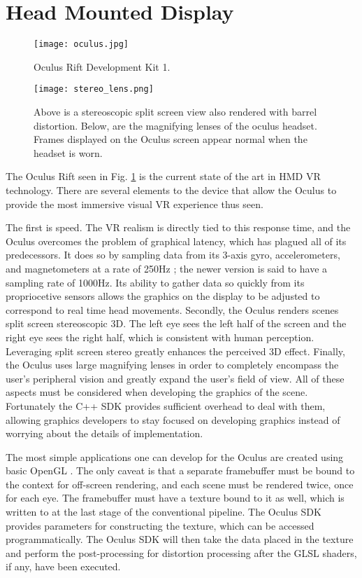 \section{Head Mounted Display}
\label{sec:hmd}

\begin{figure}[]
\centering
\texttt{[image: oculus.jpg]}
\caption{Oculus Rift Development Kit 1. 
\cite{website:pcworld}}
\label{fig:oculus}
\end{figure}

\begin{figure}[]
\centering
\texttt{[image: stereo\_lens.png]}
\caption{Above is a stereoscopic split screen view also rendered with barrel distortion.
    Below, are the magnifying lenses of the oculus headset.
Frames displayed on the Oculus screen appear normal when the headset is worn.}
\label{fig:stereo}
\end{figure}


The Oculus Rift seen in Fig. \ref{fig:oculus} is the current state of the art
in HMD VR technology. There are several elements to the device that allow the
Oculus to provide the most immersive visual VR experience thus seen.

The first is speed.  The VR realism is directly tied to this response time, and
the Oculus overcomes the problem of graphical latency, which has plagued all of
its predecessors. It does so by sampling data from its 3-axis gyro,
accelerometers, and magnetometers at a rate of 250Hz \cite{website:roadtovr};
the newer version is said to have a sampling rate of 1000Hz. Its ability to
gather data so quickly from its propriocetive sensors allows the graphics on
the display to be adjusted to correspond to real time head movements. Secondly,
the Oculus renders scenes split screen stereoscopic 3D. The left eye sees the
left half of the screen and the right eye sees the right half, which is
consistent with human perception. Leveraging split screen stereo greatly
enhances the perceived 3D effect. Finally, the Oculus uses large magnifying
lenses in order to completely encompass the user's peripheral vision and
greatly expand the user's field of view. All of these aspects must be
considered when developing the graphics of the scene. Fortunately the C++ SDK
provides sufficient overhead to deal with them, allowing graphics developers to
stay focused on developing graphics instead of worrying about the details of
implementation.

The most simple applications one can develop for the Oculus are created using
basic OpenGL \cite{website:opengl}. The only caveat is that a separate
framebuffer must be bound to the context for off-screen rendering, and each
scene must be rendered twice, once for each eye. The framebuffer must have a
texture bound to it as well, which is written to at the last stage of the
conventional pipeline.  The Oculus SDK provides parameters for constructing the
texture, which can be accessed programmatically. The Oculus SDK will then take
the data placed in the texture and perform the post-processing for distortion
processing after the GLSL shaders, if any, have been executed.

